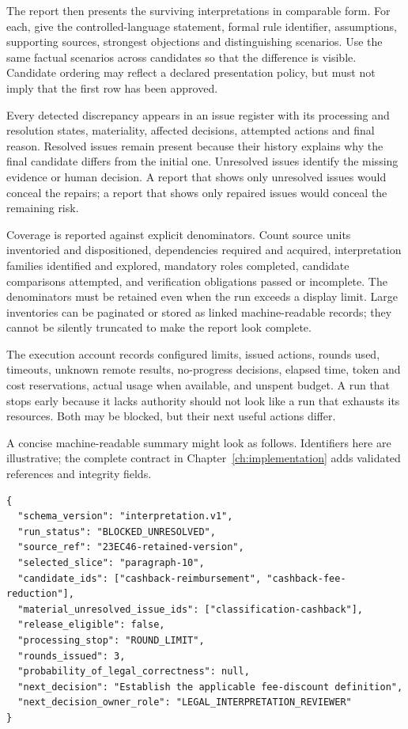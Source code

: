 The report then presents the surviving interpretations in comparable form. For
each, give the controlled-language statement, formal rule identifier, assumptions,
supporting sources, strongest objections and distinguishing scenarios. Use the
same factual scenarios across candidates so that the difference is visible.
Candidate ordering may reflect a declared presentation policy, but must not imply
that the first row has been approved.

Every detected discrepancy appears in an issue register with its processing and
resolution states, materiality, affected decisions, attempted actions and final
reason. Resolved issues remain present because their history explains why the
final candidate differs from the initial one. Unresolved issues identify the
missing evidence or human decision. A report that shows only unresolved issues
would conceal the repairs; a report that shows only repaired issues would conceal
the remaining risk.

Coverage is reported against explicit denominators. Count source units inventoried
and dispositioned, dependencies required and acquired, interpretation families
identified and explored, mandatory roles completed, candidate comparisons
attempted, and verification obligations passed or incomplete. The denominators
must be retained even when the run exceeds a display limit. Large inventories
can be paginated or stored as linked machine-readable records; they cannot be
silently truncated to make the report look complete.

The execution account records configured limits, issued actions, rounds used,
timeouts, unknown remote results, no-progress decisions, elapsed time, token and
cost reservations, actual usage when available, and unspent budget. A run that
stops early because it lacks authority should not look like a run that exhausts
its resources. Both may be blocked, but their next useful actions differ.

A concise machine-readable summary might look as follows. Identifiers here are
illustrative; the complete contract in Chapter~\ref{ch:implementation} adds
validated references and integrity fields.

\begin{lstlisting}[caption={A blocked result preserves alternatives and the next decision.}]
{
  "schema_version": "interpretation.v1",
  "run_status": "BLOCKED_UNRESOLVED",
  "source_ref": "23EC46-retained-version",
  "selected_slice": "paragraph-10",
  "candidate_ids": ["cashback-reimbursement", "cashback-fee-reduction"],
  "material_unresolved_issue_ids": ["classification-cashback"],
  "release_eligible": false,
  "processing_stop": "ROUND_LIMIT",
  "rounds_issued": 3,
  "probability_of_legal_correctness": null,
  "next_decision": "Establish the applicable fee-discount definition",
  "next_decision_owner_role": "LEGAL_INTERPRETATION_REVIEWER"
}
\end{lstlisting}


